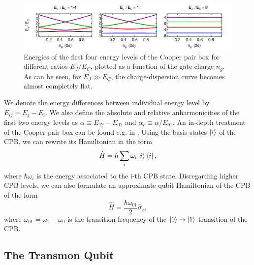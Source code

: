 \begin{figure}[ht!]
	\includegraphics[width=\textwidth]{"./material/mathematica/cooper_pair_box_energies"}
	\caption{Energies of the first four energy levels of the Cooper pair box for different ratios $E_J/E_C$, plotted as a function of the gate charge $n_g$. As can be seen, for $E_J \gg E_C$, the charge-dispersion curve becomes almost completely flat.}
	\label{fig:CooperPairBoxEnergies}
\end{figure}

We denote the energy differences between individual energy level by $E_{ij} = E_j - E_i$. We also define the absolute and relative anharmonicities of the first two energy levels as $\alpha \equiv E_{12}-E_{01}$ and $\alpha_r \equiv \alpha / E_{01}$. An in-depth treatment of the Cooper pair box can be found e.g. in \citep{cottet_implementation_2002}. Using the basis states $\left| i \right>$ of the CPB, we can rewrite its Hamiltonian in the form 
%
\begin{equation}
\hat{H} = \hbar\sum\limits_i \omega_i\left| i \right>\left< i \right|,
\end{equation}
%
where $\hbar\omega_i$ is the energy associated to the i-th CPB state. Disregarding higher CPB levels, we can also formulate an approximate qubit Hamiltonian of the CPB of the form
%
\begin{equation}
\hat{H} = \frac{\hbar\omega_{01}}{2}\hat{\sigma}_z, \label{eq:cpb_qubit_hamiltonian}
\end{equation}
%
where $\omega_{01}=\omega_1-\omega_0$ is the transition frequency of the $\left| 0 \right>\to\left| 1 \right>$ transition of the CPB.

\subsection{The Transmon Qubit}

